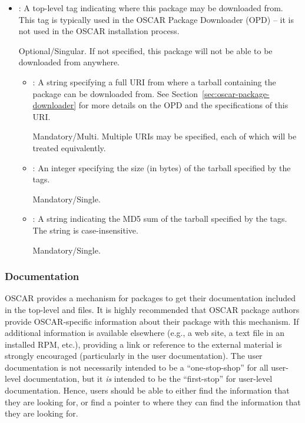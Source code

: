 \begin{itemize}
\begin{itemize}
  \end{itemize}
  
\item {}: A top-level tag indicating where this package
  may be downloaded from.  This tag is typically used in the OSCAR
  Package Downloader (OPD) -- it is not used in the OSCAR installation
  process.
  
  Optional/Singular.  If not specified, this package will not be able
  to be downloaded from anywhere. 

  \begin{itemize}
  \item {}: A string specifying a full URI from where a
    tarball containing the package can be downloaded from.  See
    Section~\ref{sec:oscar-package-downloader} for more details on the
    OPD and the specifications of this URI.

    Mandatory/Multi.  Multiple URIs may be specified, each of which
    will be treated equivalently.  
    
  \item {}: An integer specifying the size (in bytes) of
    the tarball specified by the  tags.

    Mandatory/Single.
    
  \item {}: A string indicating the MD5 sum of the
    tarball specified by the  tags.  The string is
    case-insensitive. 
    
    Mandatory/Single.
  \end{itemize}
\end{itemize}

\endchange


\subsubsection{Documentation}
\label{sec:design-pkg-docs}

OSCAR provides a mechanism for packages to get their documentation
included in the top-level  and 
files.  It is highly recommended that OSCAR package authors provide
OSCAR-specific information about their package with this mechanism.
If additional information is available elsewhere (e.g., a web site, a
text file in an installed RPM, etc.), providing a link or reference to
the external material is strongly encouraged (particularly in the user
documentation).  The user documentation is not necessarily intended to
be a ``one-stop-shop'' for all user-level documentation, but it {\em
  is} intended to be the ``first-stop'' for user-level documentation.
Hence, users should be able to either find the information that they
are looking for, or find a pointer to where they can find the
information that they are looking for.


